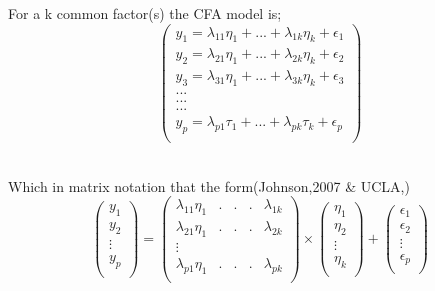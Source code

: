 \documentclass{beamer}
\begin{document}
\begin{frame}
	For a k common factor(s) the CFA model is;\\
	\[
	\left(
	\begin{matrix}
		y_1= \lambda_{11}\eta_1 +...+\lambda_{1k}\eta_k +\epsilon_1 \\
		y_2= \lambda_{21}\eta_1 +...+\lambda_{2k}\eta_k +\epsilon_2 \\
		y_3 = \lambda_{31}\eta_1+...+\lambda_{3k}\eta_k +\epsilon_3 \\
		.                  .              .      \\
		.                  .               .     \\
		.                  .              .     \\
		y_p=\lambda_{p1}\tau_1+...+\lambda_{pk}\tau_k +\epsilon_p \\                
		
	\end{matrix}
	\right)
	\]\\
\end{frame}
\begin{frame}
Which in matrix notation that the form(Johnson,2007 \& UCLA,)\\

\begin{equation}
	\left(
	\begin{matrix}
		y_1\\
		y_2\\
		\vdots \\
		y_p\\
	\end{matrix}
	\right) = 
	\left(\begin{matrix}
		\lambda_{11}\eta_1 & .&.&.& \lambda_{1k}\\
		\lambda_{21}\eta_1 &  .&.&. & \lambda_{2k}\\
		\vdots\\
		\lambda_{p1}\eta_1  & .&.&. &\lambda_{pk}\\
	\end{matrix}\right) \times
	\left(\begin{matrix}
		\eta_1\\
		\eta_2\\
		\vdots\\
		\eta_k\\
	\end{matrix}\right)+ \left(\begin{matrix}
		\epsilon_1\\
		\epsilon_2\\
		\vdots\\
		\epsilon_p\\
	\end{matrix}\right)
\end{equation}\\
\end{frame}
\end{document}
